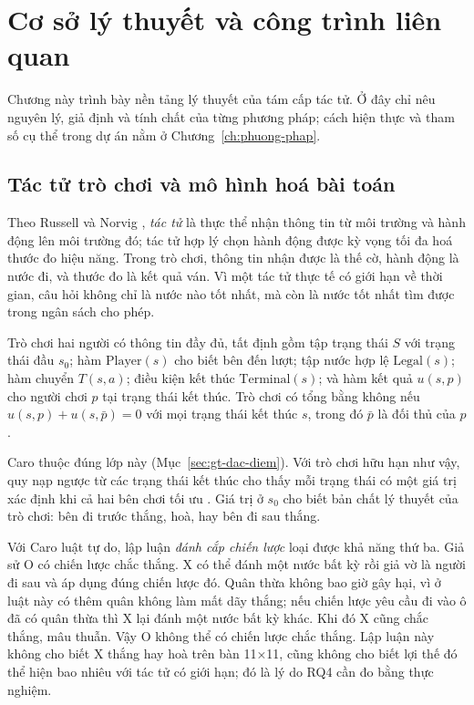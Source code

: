 \chapter{Cơ sở lý thuyết và công trình liên quan}
\label{ch:ly-thuyet}

Chương này trình bày nền tảng lý thuyết của tám cấp tác tử. Ở đây chỉ nêu nguyên lý, giả định và tính chất của từng phương pháp; cách hiện thực và tham số cụ thể trong dự án nằm ở Chương~\ref{ch:phuong-phap}.

\section{Tác tử trò chơi và mô hình hoá bài toán}
\label{sec:lt-tac-tu}
Theo Russell và Norvig \cite{russell2021aima}, \emph{tác tử} là thực thể nhận thông tin từ môi trường và hành động lên môi trường đó; tác tử hợp lý chọn hành động được kỳ vọng tối đa hoá thước đo hiệu năng. Trong trò chơi, thông tin nhận được là thế cờ, hành động là nước đi, và thước đo là kết quả ván. Vì một tác tử thực tế có giới hạn về thời gian, câu hỏi không chỉ là nước nào tốt nhất, mà còn là nước tốt nhất tìm được trong ngân sách cho phép.

\begin{dinhnghia}
\label{dn:tro-choi}
Trò chơi hai người có thông tin đầy đủ, tất định gồm tập trạng thái $S$ với trạng thái đầu $s_0$; hàm $\text{Player}(s)$ cho biết bên đến lượt; tập nước hợp lệ $\text{Legal}(s)$; hàm chuyển $T(s, a)$; điều kiện kết thúc $\text{Terminal}(s)$; và hàm kết quả $u(s, p)$ cho người chơi $p$ tại trạng thái kết thúc. Trò chơi có tổng bằng không nếu $u(s, p) + u(s, \bar{p}) = 0$ với mọi trạng thái kết thúc $s$, trong đó $\bar{p}$ là đối thủ của $p$.
\end{dinhnghia}

Caro thuộc đúng lớp này (Mục~\ref{sec:gt-dac-diem}). Với trò chơi hữu hạn như vậy, quy nạp ngược từ các trạng thái kết thúc cho thấy mỗi trạng thái có một giá trị xác định khi cả hai bên chơi tối ưu \cite{russell2021aima}. Giá trị ở $s_0$ cho biết bản chất lý thuyết của trò chơi: bên đi trước thắng, hoà, hay bên đi sau thắng.

Với Caro luật tự do, lập luận \emph{đánh cắp chiến lược} loại được khả năng thứ ba. Giả sử O có chiến lược chắc thắng. X có thể đánh một nước bất kỳ rồi giả vờ là người đi sau và áp dụng đúng chiến lược đó. Quân thừa không bao giờ gây hại, vì ở luật này có thêm quân không làm mất dãy thắng; nếu chiến lược yêu cầu đi vào ô đã có quân thừa thì X lại đánh một nước bất kỳ khác. Khi đó X cũng chắc thắng, mâu thuẫn. Vậy O không thể có chiến lược chắc thắng. Lập luận này không cho biết X thắng hay hoà trên bàn 11×11, cũng không cho biết lợi thế đó thể hiện bao nhiêu với tác tử có giới hạn; đó là lý do RQ4 cần đo bằng thực nghiệm.

